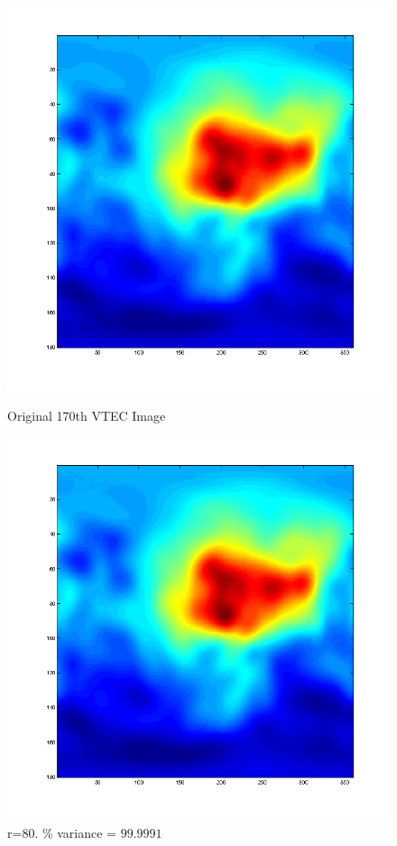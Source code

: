 \documentclass[12pt,english]{article}
\begin{document}
\begin{figure}
\begin{minipage}{0.5\linewidth}
    \includegraphics[width=\linewidth]{pca-part-c-VTEC_Images-original.png}
    \caption{Original 170th VTEC Image}
\end{minipage}
\begin{minipage}{0.5\linewidth}
    \includegraphics[width=\linewidth]{pca-part-c-VTEC_Images-reconstructed-r=80.png}
    \caption{r=80. \% variance = $99.9991$}
\end{minipage}
\end{figure}
\end{document}
